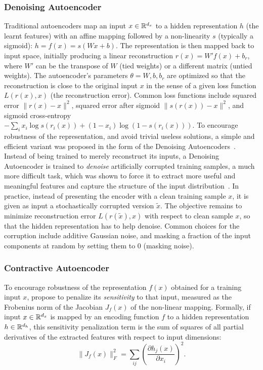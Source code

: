 \subsubsection{Denoising Autoencoder}
Traditional autoencoders map an input $x \in \mathbb{R}^{d_x}$ to a hidden
representation $h$ (the learnt features) with an affine mapping followed by a non-linearity $s$
(typically a sigmoid): $h = f(x) = s(Wx+b)$. The representation is then mapped back to
input space, initially producing a linear reconstruction $r(x)=W'f(x)+b_r$, where $W'$ can
be the transpose of $W$ (tied weights) or a different matrix (untied
weights).  The autoencoder's parameters $\theta={W,b,b_r}$ are optimized so
that the reconstruction is close to the original input $x$ in the sense of
a given loss function $L(r(x),x)$ (the reconstruction error). 
Common loss functions include squared error
$\|r(x)-x\|^2$, squared error after sigmoid $\|s(r(x))-x\|^2$, and sigmoid
cross-entropy $-\sum_i x_i \log s(r_i(x)) + (1-x_i) \log(1-s(r_i(x)))$.
To encourage robustness of the representation, and avoid trivial useless
solutions, a simple and efficient
variant was proposed in the form of the Denoising
Autoencoders~\citep{VincentPLarochelleH2008,Vincent-JMLR-2010}. 
Instead of being trained to merely reconstruct its inputs, a Denoising
Autoencoder is trained to \emph{denoise} artificially corrupted training samples, 
a much more difficult task, which was shown to force it to extract more
useful and meaningful features and capture the structure of the
input distribution~\citep{Vincent-JMLR-2010}. In practice, 
instead of presenting the encoder with a clean training sample $x$, it is given
as input a stochastically corrupted version $\tilde{x}$. The objective
remains to minimize reconstruction error $L(r(\tilde{x}),x)$ with respect to clean sample
$x$, so that the hidden representation has to help denoise.  
Common choices for the corruption include additive Gaussian noise, and
masking a fraction of the input components at random by setting them to 0
(masking noise).

\subsubsection{Contractive Autoencoder}
To encourage robustness of the representation $f(x)$ obtained for a training
input $x$, \citep{Rifai+al-2011} propose to penalize its {\em sensitivity} to
that input, measured as the Frobenius norm of the Jacobian $J_f(x)$
of the non-linear mapping. Formally, if input $x \in \mathbb{R}^{d_x}$ is mapped by an encoding
function $f$ to a hidden representation $h \in \mathbb{R}^{d_h}$, this sensitivity
penalization term is the sum of squares of all partial derivatives of the
extracted features with respect to input dimensions: \begin{equation}
\nonumber\|J_f(x)\|_F^2 = \sum_{ij} \left( \frac{\partial h_j(x)}{\partial x_i}
\right)^2.  \label{eq:sensitivity} \end{equation}

